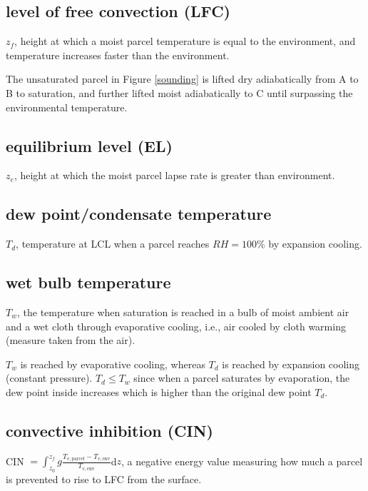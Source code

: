 \subsection{level of free convection (LFC)}
\begin{defn*} $z_f$, height at which a moist parcel temperature is equal to the environment,
and temperature increases faster than the environment. 
\end{defn*}

\begin{exmp*} 
The unsaturated parcel in Figure {\ref{sounding}} is lifted dry adiabatically from A
to B to saturation, and further lifted moist adiabatically to C until surpassing the environmental
temperature.
\end{exmp*}

\subsection{equilibrium level (EL)}
\begin{defn*} $z_e$, height at which the moist parcel lapse rate is greater than environment.
\end{defn*}

\subsection{dew point/condensate temperature}
\begin{defn*} $T_d$, temperature at LCL when a parcel reaches $RH=100\%$ by expansion cooling.
\end{defn*}

\subsection{wet bulb temperature}
\begin{defn*} $T_w$, the temperature when saturation is reached in a bulb of moist ambient air
and a wet cloth through evaporative cooling, i.e., air cooled by cloth warming (measure taken from
the air). 
\end{defn*}

$T_w$ is reached by evaporative cooling, whereas $T_d$ is reached by expansion cooling (constant
pressure). $T_d \le T_w$ since when a parcel saturates by evaporation, the dew point inside
increases which is higher than the original dew point $T_d$.

\subsection{convective inhibition (CIN)}
\begin{defn*} 
CIN $=\int_{z_0}^{z_f} g \frac{T_{v,\text{parcel}} - T_{v,\text{env}}}{T_{v,\text{env}}} $d$z$, 
a negative energy value measuring how much a parcel is prevented to rise to LFC from the surface. \\
\end{defn*}

